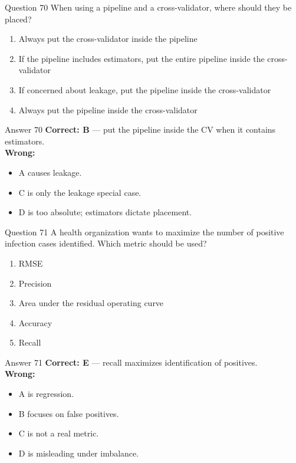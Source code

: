 \documentclass[aspectratio=169,11pt]{beamer}
\begin{document}
	\begin{frame}{Question 70}
		When using a pipeline and a cross-validator, where should they be placed?
		\begin{enumerate}[label=\Alph*.]
			\item Always put the cross-validator inside the pipeline
			\item If the pipeline includes estimators, put the entire pipeline inside the cross-validator
			\item If concerned about leakage, put the pipeline inside the cross-validator
			\item Always put the pipeline inside the cross-validator
		\end{enumerate}
	\end{frame}
	\begin{frame}{Answer 70}
		\textbf{Correct: B} --- put the pipeline inside the CV when it contains estimators.\\
		\vspace{0.5em}
		\textbf{Wrong:}
		\begin{itemize}
			\item A causes leakage.
			\item C is only the leakage special case.
			\item D is too absolute; estimators dictate placement.
		\end{itemize}
	\end{frame}
	
	\begin{frame}{Question 71}
		A health organization wants to maximize the number of positive infection cases identified. Which metric should be used?
		\begin{enumerate}[label=\Alph*.]
			\item RMSE
			\item Precision
			\item Area under the residual operating curve
			\item Accuracy
			\item Recall
		\end{enumerate}
	\end{frame}
	\begin{frame}{Answer 71}
		\textbf{Correct: E} --- recall maximizes identification of positives.\\
		\vspace{0.5em}
		\textbf{Wrong:}
		\begin{itemize}
			\item A is regression.
			\item B focuses on false positives.
			\item C is not a real metric.
			\item D is misleading under imbalance.
		\end{itemize}
	\end{frame}
	
\end{document}
